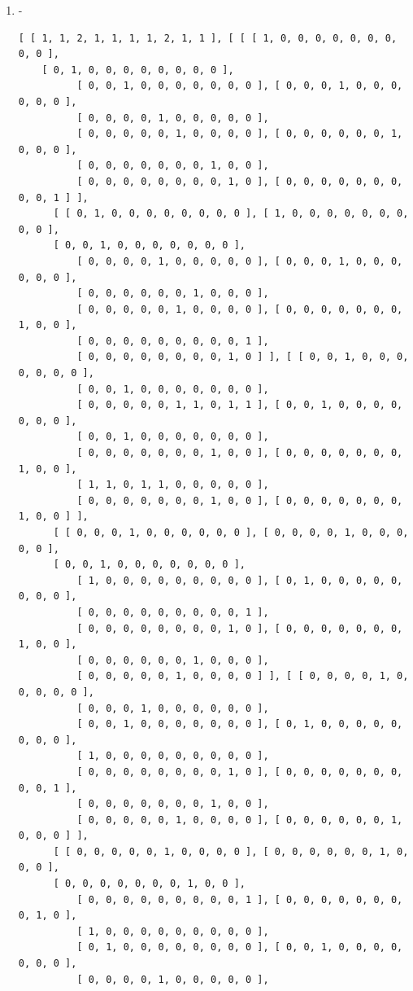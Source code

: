 \documentclass[a4paper, 10pt]{book}
\theoremstyle{definition}
\numberwithin{equation}{chapter}
\begin{document}
\begin{appendices}
\begin{enumerate}
\begin{lstlisting}[numbers=none]
	\end{lstlisting}
	\item -
	\begin{lstlisting}[numbers=none]
	[ [ 1, 1, 2, 1, 1, 1, 1, 2, 1, 1 ], [ [ [ 1, 0, 0, 0, 0, 0, 0, 0, 0, 0 ], 
	[ 0, 1, 0, 0, 0, 0, 0, 0, 0, 0 ], 
          [ 0, 0, 1, 0, 0, 0, 0, 0, 0, 0 ], [ 0, 0, 0, 1, 0, 0, 0, 0, 0, 0 ], 
          [ 0, 0, 0, 0, 1, 0, 0, 0, 0, 0 ], 
          [ 0, 0, 0, 0, 0, 1, 0, 0, 0, 0 ], [ 0, 0, 0, 0, 0, 0, 1, 0, 0, 0 ], 
          [ 0, 0, 0, 0, 0, 0, 0, 1, 0, 0 ], 
          [ 0, 0, 0, 0, 0, 0, 0, 0, 1, 0 ], [ 0, 0, 0, 0, 0, 0, 0, 0, 0, 1 ] ], 
      [ [ 0, 1, 0, 0, 0, 0, 0, 0, 0, 0 ], [ 1, 0, 0, 0, 0, 0, 0, 0, 0, 0 ], 
      [ 0, 0, 1, 0, 0, 0, 0, 0, 0, 0 ], 
          [ 0, 0, 0, 0, 1, 0, 0, 0, 0, 0 ], [ 0, 0, 0, 1, 0, 0, 0, 0, 0, 0 ], 
          [ 0, 0, 0, 0, 0, 0, 1, 0, 0, 0 ], 
          [ 0, 0, 0, 0, 0, 1, 0, 0, 0, 0 ], [ 0, 0, 0, 0, 0, 0, 0, 1, 0, 0 ], 
          [ 0, 0, 0, 0, 0, 0, 0, 0, 0, 1 ], 
          [ 0, 0, 0, 0, 0, 0, 0, 0, 1, 0 ] ], [ [ 0, 0, 1, 0, 0, 0, 0, 0, 0, 0 ], 
          [ 0, 0, 1, 0, 0, 0, 0, 0, 0, 0 ], 
          [ 0, 0, 0, 0, 0, 1, 1, 0, 1, 1 ], [ 0, 0, 1, 0, 0, 0, 0, 0, 0, 0 ], 
          [ 0, 0, 1, 0, 0, 0, 0, 0, 0, 0 ], 
          [ 0, 0, 0, 0, 0, 0, 0, 1, 0, 0 ], [ 0, 0, 0, 0, 0, 0, 0, 1, 0, 0 ], 
          [ 1, 1, 0, 1, 1, 0, 0, 0, 0, 0 ], 
          [ 0, 0, 0, 0, 0, 0, 0, 1, 0, 0 ], [ 0, 0, 0, 0, 0, 0, 0, 1, 0, 0 ] ], 
      [ [ 0, 0, 0, 1, 0, 0, 0, 0, 0, 0 ], [ 0, 0, 0, 0, 1, 0, 0, 0, 0, 0 ], 
      [ 0, 0, 1, 0, 0, 0, 0, 0, 0, 0 ], 
          [ 1, 0, 0, 0, 0, 0, 0, 0, 0, 0 ], [ 0, 1, 0, 0, 0, 0, 0, 0, 0, 0 ], 
          [ 0, 0, 0, 0, 0, 0, 0, 0, 0, 1 ], 
          [ 0, 0, 0, 0, 0, 0, 0, 0, 1, 0 ], [ 0, 0, 0, 0, 0, 0, 0, 1, 0, 0 ], 
          [ 0, 0, 0, 0, 0, 0, 1, 0, 0, 0 ], 
          [ 0, 0, 0, 0, 0, 1, 0, 0, 0, 0 ] ], [ [ 0, 0, 0, 0, 1, 0, 0, 0, 0, 0 ], 
          [ 0, 0, 0, 1, 0, 0, 0, 0, 0, 0 ], 
          [ 0, 0, 1, 0, 0, 0, 0, 0, 0, 0 ], [ 0, 1, 0, 0, 0, 0, 0, 0, 0, 0 ], 
          [ 1, 0, 0, 0, 0, 0, 0, 0, 0, 0 ], 
          [ 0, 0, 0, 0, 0, 0, 0, 0, 1, 0 ], [ 0, 0, 0, 0, 0, 0, 0, 0, 0, 1 ], 
          [ 0, 0, 0, 0, 0, 0, 0, 1, 0, 0 ], 
          [ 0, 0, 0, 0, 0, 1, 0, 0, 0, 0 ], [ 0, 0, 0, 0, 0, 0, 1, 0, 0, 0 ] ], 
      [ [ 0, 0, 0, 0, 0, 1, 0, 0, 0, 0 ], [ 0, 0, 0, 0, 0, 0, 1, 0, 0, 0 ], 
      [ 0, 0, 0, 0, 0, 0, 0, 1, 0, 0 ], 
          [ 0, 0, 0, 0, 0, 0, 0, 0, 0, 1 ], [ 0, 0, 0, 0, 0, 0, 0, 0, 1, 0 ], 
          [ 1, 0, 0, 0, 0, 0, 0, 0, 0, 0 ], 
          [ 0, 1, 0, 0, 0, 0, 0, 0, 0, 0 ], [ 0, 0, 1, 0, 0, 0, 0, 0, 0, 0 ], 
          [ 0, 0, 0, 0, 1, 0, 0, 0, 0, 0 ], 

\end{lstlisting}
\end{enumerate}
\end{appendices}
\end{document}
